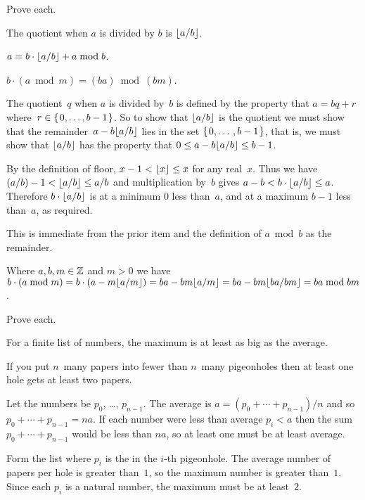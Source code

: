 \documentclass{ibl}  %
\begin{document}
\begin{ex} Prove each.
\begin{exes} 
\item The quotient when $a$ is divided by $b$ is $\lfloor a/b \rfloor$.
\item $a =b\cdot\lfloor a/b \rfloor+a\bmod b$.    
\item $b\cdot(a\bmod m)=(ba)\bmod{(bm)}$.    
\end{exes}
\begin{ans}
\begin{exes}
\item The quotient~$q$ when $a$ is divided by~$b$ is defined by the
  property that $a=bq+r$ where~$r\in\mbox{$\{\hspace{0.1em}0,\ldots,b-1\hspace{0.1em}\}$}$.
  So to show that $\lfloor a/b \rfloor$ is the quotient we must show that 
  the remainder~$a-b\lfloor a/b \rfloor$
  lies in the set $\mbox{$\{\hspace{0.1em}0,\ldots\,,b-1\hspace{0.1em}\}$}$, that is, 
  we must show that $\lfloor a/b \rfloor$ has the property 
  that $0\leq a-b\lfloor a/b \rfloor\leq b-1$.
  
  By the definition of floor, $x-1<\lfloor x \rfloor\leq x$ for any real~$x$. 
  Thus we have
  $(a/b)-1< \lfloor a/b \rfloor\leq a/b$ and multiplication by~$b$ gives
  $a-b< b\cdot\lfloor a/b \rfloor\leq a$.
  Therefore $b\cdot\lfloor a/b \rfloor$ is at a minimum $0$ less than~$a$, and
  at a maximum $b-1$ less than~$a$, as required.
\item This is immediate from the prior item and the 
  definition of $a\bmod b$ as the remainder.
\item Where $a, b, m\in\mathbb{Z}$ and $m>0$ we have
  $b\cdot(a\bmod m)=b\cdot(a-m\lfloor a/m \rfloor)
  =ba- bm\lfloor a/m \rfloor
  =ba- bm\lfloor ba/bm \rfloor
  =ba\bmod bm$.    
\end{exes}
\end{ans}
\end{ex}


\begin{ex}  Prove each.
\begin{exes}
\item For a finite list of numbers,
  the maximum is at least as big as the average.
\item If you put $n$~many papers into fewer than $n$~many 
  pigeonholes then at least one hole gets at least two papers.    
\end{exes}
\begin{ans}
\begin{exes}
\item Let the numbers be $p_0$, \ldots, $p_{n-1}$.
  The average is $a=(p_0+\cdots+p_{n-1})/n$ and so 
  $p_0+\cdots+p_{n-1}=na$.
  If each number were less than average $p_i<a$ then the sum
  $p_0+\cdots+p_{n-1}$ would be less than $na$, so at least
  one must be at least average.
\item Form the list where $p_i$ is the in the $i$-th pigeonhole.
  The average number of papers per hole is greater than~$1$, 
  so the maximum number is greater than~$1$.
  Since each $p_i$ is a natural number, the maximum must be at least~$2$.      
\end{exes}
\end{ans}
\end{ex}
\end{document}
